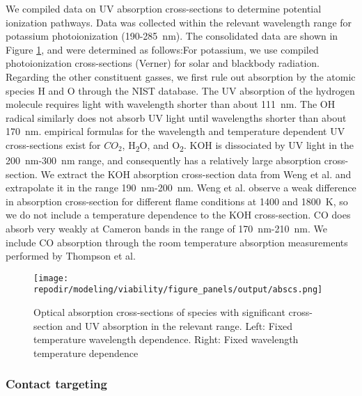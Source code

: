 We compiled data on UV absorption cross-sections to determine potential ionization pathways. Data was collected within the relevant wavelength range for potassium photoionization (190-\SI{285}{\nano\meter}). The consolidated data are shown in Figure \ref{fig:SI_UV_abscs}, and were determined as follows:For potassium, we use compiled photoionization cross-sections (Verner) for solar and blackbody radiation.\cite{huebnerPhotoionizationPhotodissociationRates2015} Regarding the other constituent gasses, we first rule out absorption by the atomic species H and O through the NIST database.\cite{sansonettiHandbookBasicAtomic2005} The UV absorption of the hydrogen molecule requires light with wavelength shorter than about \SI{111}{\nano\meter}.\cite{franceFARULTRAVIOLETMOLECULARHYDROGEN} The OH radical similarly does not absorb UV light until wavelengths shorter than about \SI{170}{\nano\meter}.\cite{chipmanAbsorptionSpectrumOH2008} empirical formulas for the wavelength and temperature dependent UV cross-sections exist for $CO_2$\cite{oehlschlaegerUltravioletAbsorptionCrosssections2004}, H\textsubscript{2}O,\cite{zuevUVABSORPTIONCROSS} and O\textsubscript{2}.\cite{zuevUVABSORPTIONCROSS} KOH is dissociated by UV light in the \SI{200}{\nano\meter}-\SI{300}{\nano\meter} range, and consequently has a relatively large absorption cross-section. We extract the KOH absorption cross-section data from Weng et al. and extrapolate it in the range \SI{190}{\nano\meter}-\SI{200}{\nano\meter}.\cite{wengUltravioletAbsorptionCross2019} Weng et al. observe a weak difference in absorption cross-section for different flame conditions at 1400 and \SI{1800}{\kelvin}, so we do not include a temperature dependence to the KOH cross-section. CO does absorb very weakly at Cameron bands in the range of \SI{170}{\nano\meter}-\SI{210}{\nano\meter}. We include CO absorption through the room temperature absorption measurements performed by Thompson et al.\cite{thompsonUltravioletAbsorptionCoefficients1963} 


\begin{figure}[h]
    \centering
    \texttt{[image: \\repodir/modeling/viability/figure\_panels/output/abscs.png]} 
    \caption{Optical absorption cross-sections of species with significant cross-section and UV absorption in the relevant range. Left: Fixed temperature wavelength dependence. Right: Fixed wavelength temperature dependence}
    \label{fig:SI_UV_abscs}
\end{figure}


\subsubsection{Contact targeting}


